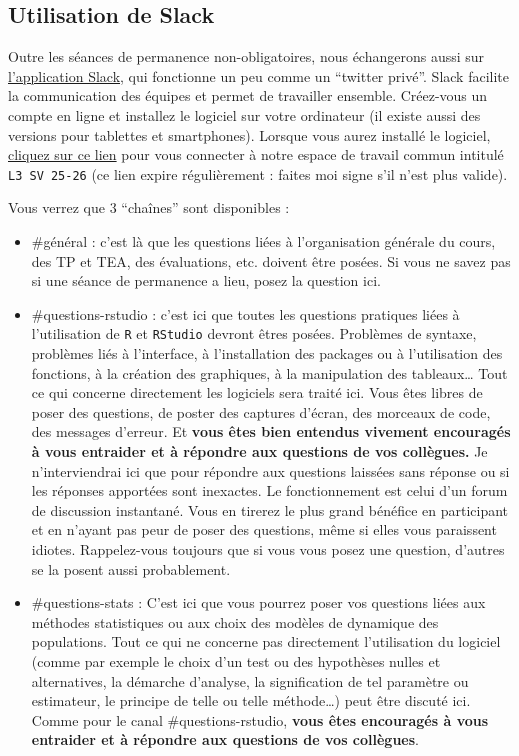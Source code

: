 \documentclass[
  french,
  a4paper,
  DIV=11,
  numbers=noendperiod,
  oneside]{scrreprt}
\providecommand{\tightlist}{%
  \setlength{\itemsep}{0pt}\setlength{\parskip}{0pt}}
\begin{document}
\subsection*{Utilisation de Slack}\label{utilisation-de-slack}

Outre les séances de permanence non-obligatoires, nous échangerons aussi
sur \href{https://slack.com/intl/fr-fr/}{l'application Slack}, qui
fonctionne un peu comme un ``twitter privé''. Slack facilite la
communication des équipes et permet de travailler ensemble. Créez-vous
un compte en ligne et installez le logiciel sur votre ordinateur (il
existe aussi des versions pour tablettes et smartphones). Lorsque vous
aurez installé le logiciel,
\href{https://join.slack.com/t/l3sv25-26/shared_invite/zt-3e5w5venb-ksvbjpQfhF9h~yBUFKBlBg}{cliquez
sur ce lien} pour vous connecter à notre espace de travail commun
intitulé \texttt{L3\ SV\ 25-26} (ce lien expire régulièrement : faites
moi signe s'il n'est plus valide).

Vous verrez que 3 ``chaînes'' sont disponibles :

\begin{itemize}
\tightlist
\item
  \#général : c'est là que les questions liées à l'organisation générale
  du cours, des TP et TEA, des évaluations, etc. doivent être posées. Si
  vous ne savez pas si une séance de permanence a lieu, posez la
  question ici.
\item
  \#questions-rstudio : c'est ici que toutes les questions pratiques
  liées à l'utilisation de \texttt{R} et \texttt{RStudio} devront êtres
  posées. Problèmes de syntaxe, problèmes liés à l'interface, à
  l'installation des packages ou à l'utilisation des fonctions, à la
  création des graphiques, à la manipulation des tableaux\ldots{} Tout
  ce qui concerne directement les logiciels sera traité ici. Vous êtes
  libres de poser des questions, de poster des captures d'écran, des
  morceaux de code, des messages d'erreur. Et \textbf{vous êtes bien
  entendus vivement encouragés à vous entraider et à répondre aux
  questions de vos collègues.} Je n'interviendrai ici que pour répondre
  aux questions laissées sans réponse ou si les réponses apportées sont
  inexactes. Le fonctionnement est celui d'un forum de discussion
  instantané. Vous en tirerez le plus grand bénéfice en participant et
  en n'ayant pas peur de poser des questions, même si elles vous
  paraissent idiotes. Rappelez-vous toujours que si vous vous posez une
  question, d'autres se la posent aussi probablement.
\item
  \#questions-stats : C'est ici que vous pourrez poser vos questions
  liées aux méthodes statistiques ou aux choix des modèles de dynamique
  des populations. Tout ce qui ne concerne pas directement l'utilisation
  du logiciel (comme par exemple le choix d'un test ou des hypothèses
  nulles et alternatives, la démarche d'analyse, la signification de tel
  paramètre ou estimateur, le principe de telle ou telle méthode\ldots)
  peut être discuté ici. Comme pour le canal \#questions-rstudio,
  \textbf{vous êtes encouragés à vous entraider et à répondre aux
  questions de vos collègues}.
\end{itemize}
\end{document}

